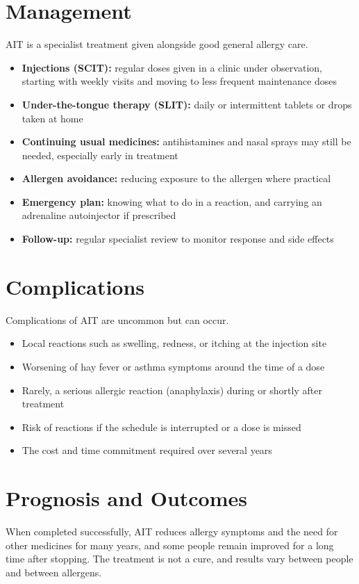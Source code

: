\section*{Management}
AIT is a specialist treatment given alongside good general allergy care.

\begin{itemize}
    \item \textbf{Injections (SCIT):} regular doses given in a clinic under observation, starting with weekly visits and moving to less frequent maintenance doses
    \item \textbf{Under-the-tongue therapy (SLIT):} daily or intermittent tablets or drops taken at home
    \item \textbf{Continuing usual medicines:} antihistamines and nasal sprays may still be needed, especially early in treatment
    \item \textbf{Allergen avoidance:} reducing exposure to the allergen where practical
    \item \textbf{Emergency plan:} knowing what to do in a reaction, and carrying an adrenaline autoinjector if prescribed
    \item \textbf{Follow-up:} regular specialist review to monitor response and side effects
\end{itemize}

\section*{Complications}
Complications of AIT are uncommon but can occur.

\begin{itemize}
    \item Local reactions such as swelling, redness, or itching at the injection site
    \item Worsening of hay fever or asthma symptoms around the time of a dose
    \item Rarely, a serious allergic reaction (anaphylaxis) during or shortly after treatment
    \item Risk of reactions if the schedule is interrupted or a dose is missed
    \item The cost and time commitment required over several years
\end{itemize}

\section*{Prognosis and Outcomes}
When completed successfully, AIT reduces allergy symptoms and the need for other medicines for many years, and some people remain improved for a long time after stopping. The treatment is not a cure, and results vary between people and between allergens.

